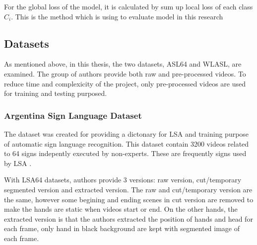 \documentclass[a4paper, 12pt]{article}
\begin{document}
For the global loss of the model, it is calculated by sum up local loss of each class $C_i$. This is the method which is using to evaluate model in this research

\subsection{Datasets}
As mentioned above, in this thesis, the two datasets, ASL64 and WLASL, are examined. The group of authors provide both raw and pre-processed videos. To reduce time and complexicity of the project, only pre-processed videos are used for training and testing purposed.

\subsubsection{Argentina Sign Language Dataset}
The dataset was created for providing a dictonary for LSA and training purpose of automatic sign language recognition. This dataset contain 3200 videos related to 64 signs indepently executed by non-experts. These are frequently signs used by LSA \citep{Ronchetti2016}.

With LSA64 datasets, authors provide 3 versions: raw version, cut/temporary segmented version and extracted version. The raw and cut/temporary version are the same, however some begining and ending scenes in cut version are removed to make the hands are static when videos start or end. On the other hands, the extracted version is that the authors extracted the position of hands and head for each frame, only hand in black background are kept with segmented image of each frame.
\end{document}

